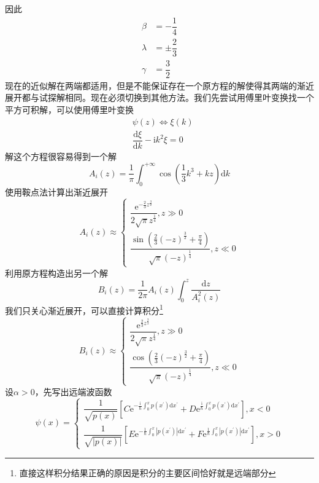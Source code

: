 \documentclass[12pt, a4paper, oneside]{ctexart}
\begin{document}
	\quad\quad 因此
	\begin{align}
		\beta&=-\dfrac{1}{4}\\
		\lambda&=\pm\dfrac{2}{3}\\
		\gamma&=\dfrac{3}{2}
	\end{align}
	\quad\quad 现在的近似解在两端都适用，但是不能保证存在一个原方程的解使得其两端的渐近展开都与试探解相同。现在必须切换到其他方法。我们先尝试用傅里叶变换找一个平方可积解，可以使用傅里叶变换
	\begin{align}
		&\psi(z)\Longleftrightarrow \xi(k)\\
		&\dfrac{\mathrm{d}\xi}{\mathrm{d}k}-\mathrm{i}k^{2}\xi=0
	\end{align}
	\quad\quad 解这个方程很容易得到一个解
	\begin{equation}
		A_{i}(z)=\dfrac{1}{\pi}\int_{0}^{+\infty}\cos\left(\dfrac{1}{3}k^{3}+kz\right)\mathrm{d}k
	\end{equation}
	\quad\quad 使用鞍点法计算出渐近展开
	\begin{equation}
		A_{i}(z)\approx\left\{\begin{matrix}
		\dfrac{\mathrm{e}^{-\frac{2}{3}z^{\frac{3}{2}}}}{2\sqrt{\pi}z^{\frac{1}{4}}},z\gg0	\\\dfrac{\sin\left(\frac{2}{3}\left(-z\right)^{\frac{3}{2}}+\frac{\pi}{4}\right)}{\sqrt{\pi}\left(-z\right)^{\frac{1}{4}}},z\ll0
		\end{matrix}\right.
	\end{equation}
	\quad\quad 利用原方程构造出另一个解
	\begin{equation}
		B_{i}(z)=\dfrac{1}{2\pi}A_{i}(z)\int_{0}^{z}\dfrac{\mathrm{d}z}{A_{i}^{2}(z)}
	\end{equation}
	\quad\quad 我们只关心渐近展开，可以直接计算积分\footnote{直接这样积分结果正确的原因是积分的主要区间恰好就是远端部分}
	\begin{equation}
		B_{i}(z)\approx\left\{\begin{matrix}
			\dfrac{\mathrm{e}^{\frac{2}{3}z^{\frac{3}{2}}}}{2\sqrt{\pi}z^{\frac{1}{4}}},z\gg0	\\\dfrac{\cos\left(\frac{2}{3}\left(-z\right)^{\frac{3}{2}}+\frac{\pi}{4}\right)}{\sqrt{\pi}\left(-z\right)^{\frac{1}{4}}},z\ll0
		\end{matrix}\right.
	\end{equation}
	\quad\quad 设$\alpha>0$，先写出远端波函数
	\begin{equation}
		\psi(x)=\left\{\begin{matrix}
		\dfrac{1}{\sqrt{p(x)}}\left[C\mathrm{e}^{-\frac{\mathrm{i}}{\hbar}\int_{0}^{x}p(x^{\prime})\mathrm{d}x^{\prime}}+D\mathrm{e}^{\frac{\mathrm{i}}{\hbar}\int_{0}^{x}p(x^{\prime})\mathrm{d}x^{\prime}}\right],x<0	\\\dfrac{1}{\sqrt{|p(x)|}}\left[E\mathrm{e}^{-\frac{1}{\hbar}\int_{0}^{x}|p(x^{\prime})|\mathrm{d}x^{\prime}}+F\mathrm{e}^{\frac{1}{\hbar}\int_{0}^{x}|p(x^{\prime})|\mathrm{d}x^{\prime}}\right],x>0
		\end{matrix}\right.
	\end{equation}
\end{document}
